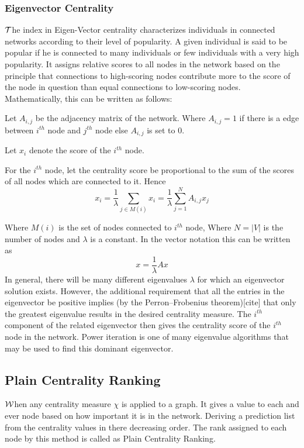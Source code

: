 \documentclass{article}
\begin{document}
\subsubsection{Eigenvector Centrality}
\hspace{.18in} $\cal T$he index in Eigen-Vector centrality characterizes individuals in connected networks according to their level of popularity. A given individual is said to be popular if he is connected to many individuals or few individuals with a very high popularity. It assigns relative scores to all nodes in the network based on the principle that connections to high-scoring nodes contribute more to the score of the node in question than equal connections to low-scoring nodes. Mathematically, this can be written as follows:

Let $ A_{i,j}$ be the adjacency matrix of the network. Where $A_{i,j}=1$ if there is a edge between $i^{th}$ node and $j^{th}$ node else $A_{i,j}$ is set to $0$.

Let $x_i$ denote the score of the $i^{th}$ node.

For the $i^{th}$ node, let the centrality score be proportional to the sum of the scores of all nodes which are connected to it. Hence
\begin{equation}
x_{i} = \frac{1}{\lambda} \sum_{j \in M(i)} x_i = \frac{1}{\lambda} \sum_{j=1}^{N} A_{i,j} x_j
\end{equation}

Where $M(i)$ is the set of nodes connected to $i^{th}$ node, Where $N = |V|$ is the number of nodes and $\lambda$ is a constant. In the vector notation this can be written as 
\begin{equation}
x = \frac{1}{\lambda} A x
\end{equation} 
In general, there will be many different eigenvalues $\lambda$ for which an eigenvector solution exists. However, the additional requirement that all the entries in the eigenvector be positive implies (by the Perron–Frobenius theorem)[cite] that only the greatest eigenvalue results in the desired centrality measure. The $i^{th}$ component of the related eigenvector then gives the centrality score of the $i^{th}$ node in the network. Power iteration is one of many eigenvalue algorithms that may be used to find this dominant eigenvector.
\subsection{Plain Centrality Ranking}
\hspace{.18in}$\cal W$hen any centrality measure $\chi$ is applied to a graph. It gives a value to each and ever node based on how important it is in the network. Deriving a prediction list from the centrality values in there decreasing order. The rank assigned to each node by this method is called as Plain Centrality Ranking.
\end{document}
